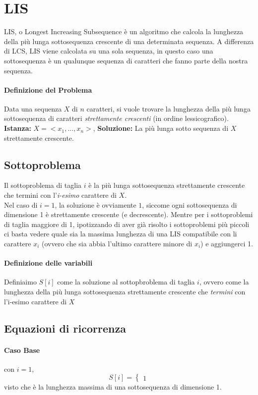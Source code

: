 \documentclass[12pt, a4paper, openany]{book}
\begin{document}
\section{LIS}
LIS, o Longest Increasing Subsequence è un algoritmo che calcola la lunghezza della più lunga sottosequenza crescente di una determinata sequenza.
A differenza di LCS, LIS viene calcolata su una sola sequenza, in questo caso una sottosequenza è un qualunque sequenza di caratteri che fanno parte della nostra sequenza.

\paragraph*{Definizione del Problema}
Data una sequenza $X$ di $n$ caratteri, si vuole trovare la lunghezza della più lunga sottosequenza di caratteri \emph{strettamente crescenti} (in ordine lessicografico).
\\\textbf{Istanza:} $X=<x_1,...,x_n>$, \textbf{Soluzione:} La più lunga sotto sequenza di $X$ strettamente crescente.


\subsection*{Sottoproblema} Il sottoproblema di taglia $i$ è la più lunga sottosequenza strettamente crescente che termini con l'\emph{i-esimo} carattere di $X$.
\\Nel caso di $i=1$, la soluzione è ovviamente $1$, siccome ogni sottosequenza di dimensione 1 è strettamente crescente (e decrescente).
Mentre per i sottoproblemi di taglia maggiore di 1, ipotizzando di aver già risolto i sottoproblemi più piccoli ci basta vedere quale sia la massima lunghezza di una LIS compatibile con li carattere $x_i$ (ovvero che sia abbia l'ultimo carattere minore di $x_i$)
e aggiungerci 1.

\paragraph{Definizione delle variabili}
Definiaimo $S[i]$ come la soluzione al sottopbroblema di taglia $i$, ovvero come la lunghezza della 
più lunga sottosequenza strettamente crescente che \emph{termini} con l'i-esimo carattere di $X$

\subsection*{Equazioni di ricorrenza}
\paragraph*{Caso Base} con $i=1$,
 $$S[i]=\begin{cases}
	 1
 \end{cases}$$
visto che è la lunghezza massima di una sottosequenza di dimensione 1.
\end{document}
